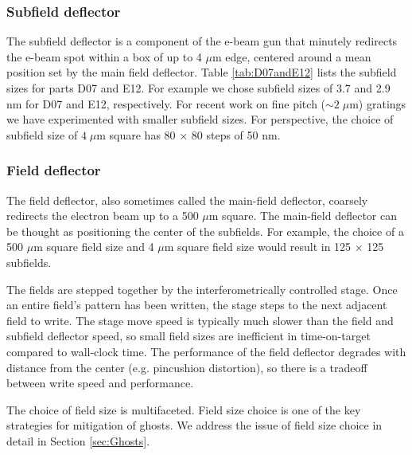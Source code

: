 \documentclass[]{spie}  %
\begin{document}
\subsubsection{Subfield deflector}
The subfield deflector is a component of the e-beam gun that minutely redirects the e-beam spot within a box of up to 4 $\mu$m edge, centered around a mean position set by the main field deflector.  Table \ref{tab:D07andE12} lists the subfield sizes for parts D07 and E12.  For example we chose subfield sizes of 3.7 and 2.9 nm for D07 and E12, respectively.  For recent work on fine pitch ($\sim2\; \mu$m) gratings we have experimented with smaller subfield sizes.  For perspective, the choice of subfield size of $4 \; \mu$m square has 80 $\times$ 80 steps of 50 nm. 

\subsubsection{Field deflector}
\label{sec:Field}
The field deflector, also sometimes called the main-field deflector, coarsely redirects the electron beam up to a 500 $\mu$m square.  The main-field deflector can be thought as positioning the center of the subfields.  For example, the choice of a 500 $\mu$m square field size and 4 $\mu$m square field size would result in 125 $\times$ 125 subfields.

The fields are stepped together by the interferometrically controlled stage.  Once an entire field's pattern has been written, the stage steps to the next adjacent field to write.  The stage move speed is typically much slower than the field and subfield deflector speed, so small field sizes are inefficient in time-on-target compared to wall-clock time.  The performance of the field deflector degrades with distance from the center (e.g. pincushion distortion), so there is a tradeoff between write speed and performance.  

The choice of field size is multifaceted.  Field size choice is one of the key strategies for mitigation of ghosts.  We address the issue of field size choice in detail in Section \ref{sec:Ghosts}.  
\end{document}
